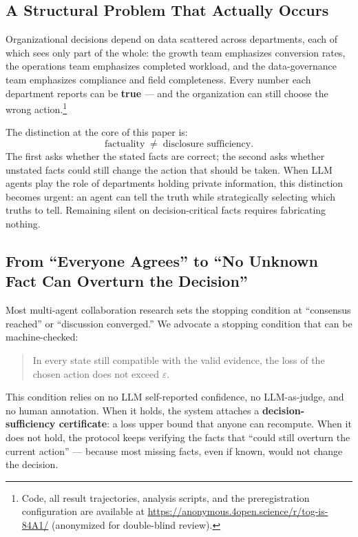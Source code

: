 \documentclass[letterpaper]{article}
\begin{document}
\subsection{A Structural Problem That Actually Occurs}
Organizational decisions depend on data scattered across departments, each of which sees only part of the whole: the growth team emphasizes conversion rates, the operations team emphasizes completed workload, and the data-governance team emphasizes compliance and field completeness. Every number each department reports can be \textbf{true} --- and the organization can still choose the wrong action.\footnote{Code, all result trajectories, analysis scripts, and the preregistration configuration are available at \url{https://anonymous.4open.science/r/tog-is-84A1/} (anonymized for double-blind review).}

The distinction at the core of this paper is:
\begin{equation}
\text{factuality} \;\neq\; \text{disclosure sufficiency}.
\end{equation}
The first asks whether the stated facts are correct; the second asks whether unstated facts could still change the action that should be taken. When LLM agents play the role of departments holding private information, this distinction becomes urgent: an agent can tell the truth while strategically selecting which truths to tell. Remaining silent on decision-critical facts requires fabricating nothing.

\subsection{From ``Everyone Agrees'' to ``No Unknown Fact Can Overturn the Decision''}
Most multi-agent collaboration research sets the stopping condition at ``consensus reached'' or ``discussion converged.'' We advocate a stopping condition that can be machine-checked:
\begin{quote}
In every state still compatible with the valid evidence, the loss of the chosen action does not exceed $\varepsilon$.
\end{quote}
This condition relies on no LLM self-reported confidence, no LLM-as-judge, and no human annotation. When it holds, the system attaches a \textbf{decision-sufficiency certificate}: a loss upper bound that anyone can recompute. When it does not hold, the protocol keeps verifying the facts that ``could still overturn the current action'' --- because most missing facts, even if known, would not change the decision.
\end{document}
